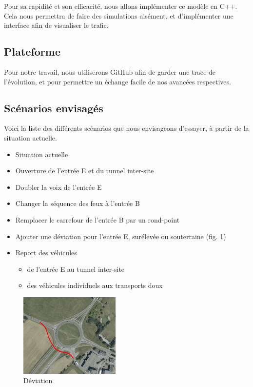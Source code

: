 \documentclass[a4paper,10pt]{extarticle}
\begin{document}
Pour sa rapidité et son efficacité, nous allons implémenter ce modèle en C++. Cela nous permettra de faire des simulations aisément, et d'implémenter une interface afin de visualiser le trafic.

\subsection*{Plateforme}

Pour notre travail, nous utiliserons GitHub afin de garder une trace de l'évolution, et pour permettre un échange facile de nos avancées respectives.

\subsection*{Scénarios envisagés}

Voici la liste des différents scénarios que nous envisageons d'essayer, à partir de la situation actuelle.

\begin{itemize}
\item Situation actuelle
\item Ouverture de l'entrée E et du tunnel inter-site
\item Doubler la voix de l'entrée E
\item Changer la séquence des feux à l'entrée B
\item Remplacer le carrefour de l'entrée B par un rond-point
\item Ajouter une déviation pour l'entrée E, surélevée ou souterraine (fig. 1)
\item Report des véhicules
\begin{itemize}
\item de l'entrée E au tunnel inter-site
\item des véhicules individuels aux transports doux
\end{itemize}
\end{itemize}

\begin{figure}[h!]
\begin{center}
\includegraphics[width=5cm]{plan_E_scenario.png}
\caption{Déviation}
\end{center}
\end{figure}
\end{document}
